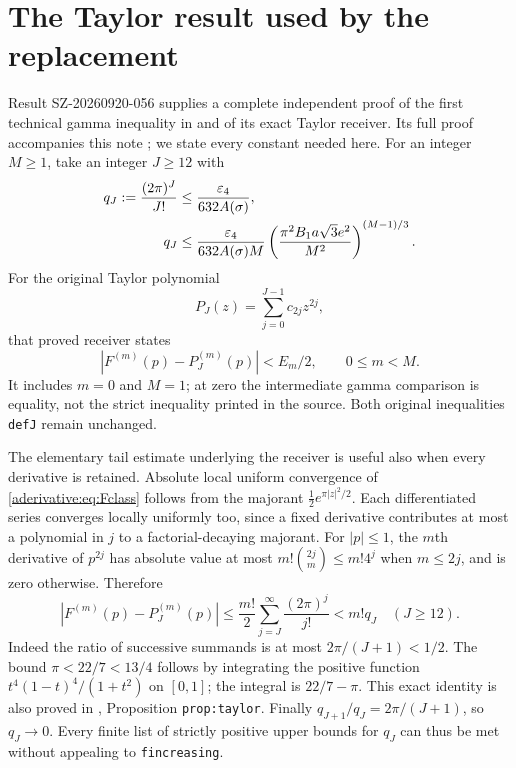 \section{The Taylor result used by the replacement}\label{aderivative:sec:taylor}
Result SZ-20260920-056 supplies a complete independent proof of
the first technical gamma inequality in \cite{aderivative:AriasII} and of
its exact Taylor receiver. Its full proof accompanies this note
\cite{aderivative:GammaProof}; we state every constant needed here.
For an integer $M\ge1$, take an integer $J\ge12$ with
\begin{align}
q_J:=\frac{(2\pi)^J}{J!}
&\le\frac{\varepsilon_4}{632A(\sigma)},\label{aderivative:eq:J1}\\
q_J&\le\frac{\varepsilon_4}{632A(\sigma)M}
\left(\frac{\pi^2B_1a\sqrt3e^2}{M^2}\right)^{(M-1)/3}.
\label{aderivative:eq:J2}
\end{align}
For the original Taylor polynomial
\begin{equation}\label{aderivative:eq:P}
P_J(z)=\sum_{j=0}^{J-1}c_{2j}z^{2j},
\end{equation}
that proved receiver states
\begin{equation}\label{aderivative:eq:Taylor}
|F^{(m)}(p)-P_J^{(m)}(p)|<E_m/2,
\qquad 0\le m<M.
\end{equation}
It includes $m=0$ and $M=1$; at zero the intermediate gamma
comparison is equality, not the strict inequality printed in
the source. Both original inequalities \texttt{defJ} remain unchanged.

The elementary tail estimate underlying the receiver is useful
also when every derivative is retained. Absolute local uniform
convergence of \eqref{aderivative:eq:Fclass} follows from the majorant
$\tfrac12 e^{\pi |z|^2/2}$. Each differentiated series converges
locally uniformly too, since a fixed derivative contributes at
most a polynomial in $j$ to a factorial-decaying majorant.
For $|p|\le1$, the $m$th derivative of $p^{2j}$ has absolute
value at most $m!\binom{2j}{m}\le m!4^j$ when $m\le2j$,
and is zero otherwise. Therefore
\begin{equation}\label{aderivative:eq:directtail}
|F^{(m)}(p)-P_J^{(m)}(p)|
\le\frac{m!}2\sum_{j=J}^\infty\frac{(2\pi)^j}{j!}
<m!q_J\quad(J\ge12).
\end{equation}
Indeed the ratio of successive summands is at most
$2\pi/(J+1)<1/2$. The bound $\pi<22/7<13/4$ follows by
integrating the positive function
$t^4(1-t)^4/(1+t^2)$ on $[0,1]$; the integral is
$22/7-\pi$. This exact identity is also proved in
\cite{aderivative:GammaProof}, Proposition \texttt{prop:taylor}.
Finally $q_{J+1}/q_J=2\pi/(J+1)$, so $q_J\to0$.
Every finite list of strictly positive upper bounds for $q_J$
can thus be met without appealing to \texttt{fincreasing}.

